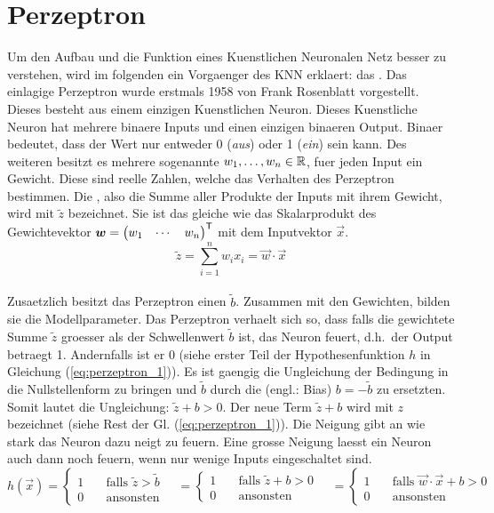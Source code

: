 \section{Perzeptron}
Um den Aufbau und die Funktion eines Kuenstlichen Neuronalen Netz besser zu
verstehen, wird im folgenden ein Vorgaenger des KNN erklaert: das .
\para{}
Das einlagige Perzeptron wurde erstmals 1958 von Frank Rosenblatt vorgestellt. Dieses
besteht aus einem einzigen Kuenstlichen Neuron. Dieses Kuenstliche Neuron
hat mehrere binaere Inputs und einen einzigen binaeren Output. Binaer
bedeutet, dass der Wert nur entweder 0 (\textit{aus}) oder 1 (\textit{ein}) sein
kann. Des weiteren besitzt es mehrere sogenannte  $w_1, \ldots,
w_n \in \mathbb{R}$, fuer jeden Input ein Gewicht.
Diese sind reelle Zahlen, welche das Verhalten des Perzeptron bestimmen.
Die , also die Summe aller Produkte der Inputs mit
ihrem Gewicht, wird mit $\tilde{z}$ bezeichnet.
Sie ist das gleiche wie das Skalarprodukt des Gewichtevektor
$\bm{w} = \begin{pmatrix} w_1 & \cdots & w_n \end{pmatrix}^{\mathsf{T}}$ mit dem
Inputvektor $\vec{x}$.
\\
\begin{equation*}
  \tilde{z} = \sum_{i=1}^{n} w_i x_i = \vec{w} \cdot \vec{x}
\end{equation*}
\\
Zusaetzlich besitzt das Perzeptron einen  $\tilde{b}$.
Zusammen mit den Gewichten, bilden sie die Modellparameter.
Das Perzeptron verhaelt sich so, dass falls die gewichtete Summe $\tilde{z}$ groesser als der
Schwellenwert $\tilde{b}$ ist, das Neuron feuert, d.h.\ der Output betraegt 1.
Andernfalls ist er 0 (siehe erster Teil der Hypothesenfunktion $h$ in Gleichung (\ref{eq:perzeptron_1})).
Es ist gaengig die Ungleichung der Bedingung in die Nullstellenform zu bringen
und $\tilde{b}$ durch die  (engl.: Bias)
$b = -\tilde{b}$ zu ersetzten. Somit lautet die Ungleichung: $\tilde{z} + b
> 0$. Der neue Term $\tilde{z} + b$ wird mit $z$ bezeichnet (siehe Rest der Gl. (\ref{eq:perzeptron_1})).
Die Neigung gibt an wie stark das Neuron dazu neigt zu feuern. Eine grosse
Neigung laesst ein Neuron auch dann noch feuern, wenn nur wenige Inputs
eingeschaltet sind.
\\
\begin{equation}\label{eq:perzeptron_1}
  h(\vec{x}) =
  \begin{cases}
    1 & \quad \text{falls } \tilde{z} > \tilde{b}\\
    0 & \quad \text{ansonsten}
  \end{cases}
  \quad =
  \begin{cases}
    1 & \quad \text{falls } \tilde{z} + b > 0\\
    0 & \quad \text{ansonsten}
  \end{cases}
  \quad =
  \begin{cases}
    1 & \quad\text{falls } \vec{w} \cdot \vec{x} + b > 0\\
    0 & \quad\text{ansonsten}
  \end{cases}
\end{equation}
